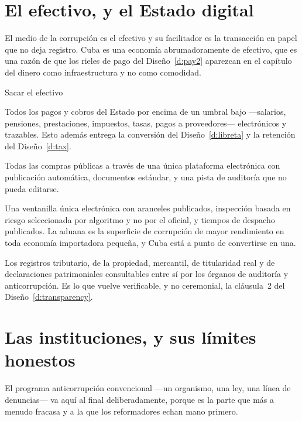 \section{El efectivo, y el Estado digital}

El medio de la corrupción es el efectivo y su facilitador es la transacción en papel que no deja
registro. Cuba es una economía abrumadoramente de efectivo, que es una razón de que los rieles de
pago del Diseño~\ref{d:pay2} aparezcan en el capítulo del dinero como infraestructura y no como
comodidad.

\begin{design}{Sacar el efectivo}
\label{d:digital}
\begin{rules}
 Todos los pagos y cobros del Estado por encima de un umbral bajo
---salarios, pensiones, prestaciones, impuestos, tasas, pagos a proveedores--- electrónicos y
trazables. Esto además entrega la conversión del Diseño~\ref{d:libreta} y la retención del
Diseño~\ref{d:tax}.

 Todas las compras públicas a través de una única plataforma
electrónica con publicación automática, documentos estándar, y una pista de auditoría que no pueda
editarse.

 Una ventanilla única electrónica con aranceles publicados, inspección basada en
riesgo seleccionada por algoritmo y no por el oficial, y tiempos de despacho publicados. La aduana
es la superficie de corrupción de mayor rendimiento en toda economía importadora pequeña, y Cuba
está a punto de convertirse en una.

 Los registros tributario, de la propiedad, mercantil, de
titularidad real y de declaraciones patrimoniales consultables entre sí por los órganos de
auditoría y anticorrupción. Es lo que vuelve verificable, y no ceremonial, la cláusula~2 del
Diseño~\ref{d:transparency}.
\end{rules}
\end{design}

\section{Las instituciones, y sus límites honestos}

El programa anticorrupción convencional ---un organismo, una ley, una línea de denuncias--- va
aquí al final deliberadamente, porque es la parte que más a menudo fracasa y a la que los
reformadores echan mano primero.


